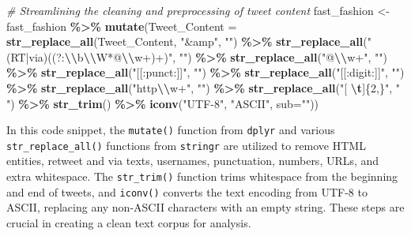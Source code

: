 \documentclass[
]{book}
\newenvironment{Shaded}{\begin{snugshade}}{\end{snugshade}}
\newcommand{\AttributeTok}[1]{\textcolor[rgb]{0.13,0.29,0.53}{#1}}
\newcommand{\CommentTok}[1]{\textcolor[rgb]{0.56,0.35,0.01}{\textit{#1}}}
\newcommand{\FunctionTok}[1]{\textcolor[rgb]{0.13,0.29,0.53}{\textbf{#1}}}
\newcommand{\NormalTok}[1]{#1}
\newcommand{\OtherTok}[1]{\textcolor[rgb]{0.56,0.35,0.01}{#1}}
\newcommand{\SpecialCharTok}[1]{\textcolor[rgb]{0.81,0.36,0.00}{\textbf{#1}}}
\newcommand{\StringTok}[1]{\textcolor[rgb]{0.31,0.60,0.02}{#1}}
\begin{document}
\begin{Shaded}
\begin{Highlighting}[]
\CommentTok{\# Streamlining the cleaning and preprocessing of tweet content}
\NormalTok{fast\_fashion }\OtherTok{\textless{}{-}}\NormalTok{ fast\_fashion }\SpecialCharTok{\%\textgreater{}\%}
  \FunctionTok{mutate}\NormalTok{(}\AttributeTok{Tweet\_Content =} \FunctionTok{str\_replace\_all}\NormalTok{(Tweet\_Content, }\StringTok{"\&amp"}\NormalTok{, }\StringTok{""}\NormalTok{) }\SpecialCharTok{\%\textgreater{}\%}
           \FunctionTok{str\_replace\_all}\NormalTok{(}\StringTok{"(RT|via)((?:}\SpecialCharTok{\textbackslash{}\textbackslash{}}\StringTok{b}\SpecialCharTok{\textbackslash{}\textbackslash{}}\StringTok{W*@}\SpecialCharTok{\textbackslash{}\textbackslash{}}\StringTok{w+)+)"}\NormalTok{, }\StringTok{""}\NormalTok{) }\SpecialCharTok{\%\textgreater{}\%}
           \FunctionTok{str\_replace\_all}\NormalTok{(}\StringTok{"@}\SpecialCharTok{\textbackslash{}\textbackslash{}}\StringTok{w+"}\NormalTok{, }\StringTok{""}\NormalTok{) }\SpecialCharTok{\%\textgreater{}\%}
           \FunctionTok{str\_replace\_all}\NormalTok{(}\StringTok{"[[:punct:]]"}\NormalTok{, }\StringTok{""}\NormalTok{) }\SpecialCharTok{\%\textgreater{}\%}
           \FunctionTok{str\_replace\_all}\NormalTok{(}\StringTok{"[[:digit:]]"}\NormalTok{, }\StringTok{""}\NormalTok{) }\SpecialCharTok{\%\textgreater{}\%}
           \FunctionTok{str\_replace\_all}\NormalTok{(}\StringTok{"http}\SpecialCharTok{\textbackslash{}\textbackslash{}}\StringTok{w+"}\NormalTok{, }\StringTok{""}\NormalTok{) }\SpecialCharTok{\%\textgreater{}\%}
           \FunctionTok{str\_replace\_all}\NormalTok{(}\StringTok{"[ }\SpecialCharTok{\textbackslash{}t}\StringTok{]\{2,\}"}\NormalTok{, }\StringTok{" "}\NormalTok{) }\SpecialCharTok{\%\textgreater{}\%}
           \FunctionTok{str\_trim}\NormalTok{() }\SpecialCharTok{\%\textgreater{}\%}
           \FunctionTok{iconv}\NormalTok{(}\StringTok{"UTF{-}8"}\NormalTok{, }\StringTok{"ASCII"}\NormalTok{, }\AttributeTok{sub=}\StringTok{""}\NormalTok{))}
\end{Highlighting}
\end{Shaded}

In this code snippet, the \texttt{mutate()} function from \texttt{dplyr} and various \texttt{str\_replace\_all()} functions from \texttt{stringr} are utilized to remove HTML entities, retweet and via texts, usernames, punctuation, numbers, URLs, and extra whitespace. The \texttt{str\_trim()} function trims whitespace from the beginning and end of tweets, and \texttt{iconv()} converts the text encoding from UTF-8 to ASCII, replacing any non-ASCII characters with an empty string. These steps are crucial in creating a clean text corpus for analysis.
\end{document}
